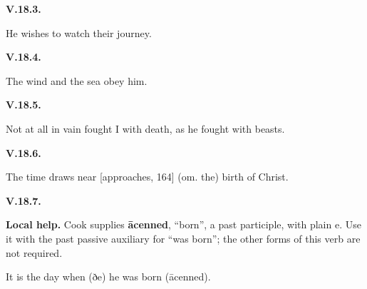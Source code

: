 \par\begin{minipage}{\linewidth}\raggedright
\textbf{V.18.3.}

He wishes to watch their journey.

\end{minipage}\par\addvspace{4pt}

\par\begin{minipage}{\linewidth}\raggedright
\textbf{V.18.4.}

The wind and the sea obey him.

\end{minipage}\par\addvspace{4pt}

\par\begin{minipage}{\linewidth}\raggedright
\textbf{V.18.5.}

Not at all in vain fought I with death, as he fought with beasts.

\end{minipage}\par\addvspace{4pt}

\par\begin{minipage}{\linewidth}\raggedright
\textbf{V.18.6.}

The time draws near [approaches, 164] (om. the) birth of Christ.

\end{minipage}\par\addvspace{4pt}

\par\begin{minipage}{\linewidth}\raggedright
\textbf{V.18.7.}

\textbf{Local help.} Cook supplies \textbf{ācenned}, “born”, a past participle, with plain e. Use it with the past passive auxiliary for “was born”; the other forms of this verb are not required.

It is the day when (ðe) he was born (ācenned).

\end{minipage}\par\addvspace{4pt}

